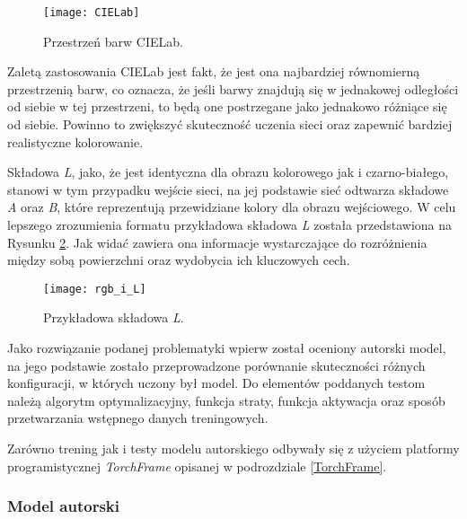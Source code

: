   \begin{figure}
    \centering
    \captionsetup{justification=centering}
    \texttt{[image: CIELab]}
    \caption[Przestrzeń barw CIELab - źródło:
    \url{https://www.flickr.com/photos/greenmambagreenmamba/4236391637}]
    {Przestrzeń barw CIELab.}
    \label{fig:CIELab}
  \end{figure}

  Zaletą zastosowania CIELab jest fakt, że jest ona najbardziej równomierną
  przestrzenią barw, co oznacza, że jeśli barwy znajdują się w jednakowej
  odległości od siebie w tej przestrzeni, to będą one postrzegane jako jednakowo
  różniące się od siebie. Powinno to zwiększyć skuteczność uczenia sieci oraz
  zapewnić bardziej realistyczne kolorowanie.

  Składowa \textit{L}, jako, że jest identyczna dla obrazu kolorowego jak i
  czarno-białego, stanowi w tym przypadku wejście sieci, na jej podstawie sieć
  odtwarza składowe \textit{A} oraz \textit{B}, które reprezentują przewidziane
  kolory dla obrazu wejściowego. W celu lepszego zrozumienia formatu przykładowa
  składowa \textit{L} została przedstawiona na Rysunku \ref{fig:przyklad_L}.
  Jak widać zawiera ona informacje wystarczające do rozróżnienia między sobą
  powierzchni oraz wydobycia ich kluczowych cech.

  \begin{figure}[ht]
    \centering
    \captionsetup{justification=centering}
    \texttt{[image: rgb\_i\_L]}
    \caption[Przykładowa składowa \textit{L} - źródło: Rysunek własny
    wykorzystujący:
    \url{https://fr.m.wikipedia.org/wiki/Fichier:An_F-A-18C_Hornet_launches_from_the_flight_deck_of_the_conventionally_powered_aircraft_carrier.jpg}]
    {Przykładowa składowa \textit{L}.}
    \label{fig:przyklad_L}
  \end{figure}

  Jako rozwiązanie podanej problematyki wpierw został oceniony autorski
  model, na jego podstawie zostało przeprowadzone porównanie skuteczności
  różnych konfiguracji, w których uczony był model. Do elementów poddanych
  testom należą algorytm optymalizacyjny, funkcja straty, funkcja aktywacja oraz
  sposób przetwarzania wstępnego danych treningowych.

  Zarówno trening jak i testy modelu autorskiego odbywały się
  z użyciem platformy programistycznej \textit{TorchFrame} opisanej w
  podrozdziale \ref{TorchFrame}.

\subsubsection{Model autorski} \label{model autorski}

